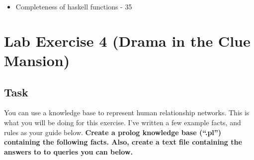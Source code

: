 \begin{itemize}
\tightlist
\item
  Completeness of haskell functions - 35
\end{itemize}

\chapter{Lab Exercise 4 (Drama in the Clue
Mansion)}\label{lab-exercise-4-drama-in-the-clue-mansion.md__lab-exercise-4-drama-in-the-clue-mansion}

\section{Task}\label{lab-exercise-4-drama-in-the-clue-mansion.md__task}

You can use a knowledge base to represent human relationship networks.
This is what you will be doing for this exercise. I've written a few
example facts, and rules as your guide below. \textbf{Create a prolog
knowledge base (``.pl'') containing the following facts. Also, create a
text file containing the answers to to queries you can below.}

